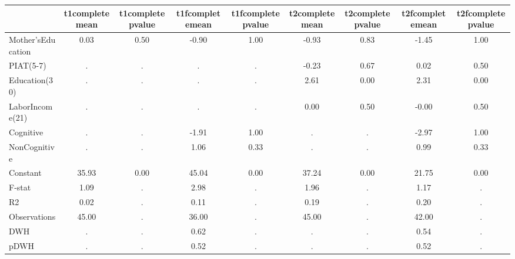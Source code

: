 \begin{table}[htbp]
\begin{tabular}{lcccccccc} \hline \hline
 & t1completemean  & t1completepvalue  & t1fcompletemean  & t1fcompletepvalue  & t2completemean  & t2completepvalue  & t2fcompletemean  & t2fcompletepvalue  \\  \hline 
Mother'sEducation &         0.03 &         0.50 &        -0.90 &         1.00 &        -0.93 &         0.83 &        -1.45 &         1.00 \\  
PIAT(5-7) &            . &            . &            . &            . &        -0.23 &         0.67 &         0.02 &         0.50 \\  
Education(30) &            . &            . &            . &            . &         2.61 &         0.00 &         2.31 &         0.00 \\  
LaborIncome(21) &            . &            . &            . &            . &         0.00 &         0.50 &        -0.00 &         0.50 \\  
Cognitive &            . &            . &        -1.91 &         1.00 &            . &            . &        -2.97 &         1.00 \\  
NonCognitive &            . &            . &         1.06 &         0.33 &            . &            . &         0.99 &         0.33 \\  
Constant &        35.93 &         0.00 &        45.04 &         0.00 &        37.24 &         0.00 &        21.75 &         0.00 \\  
F-stat &         1.09 &            . &         2.98 &            . &         1.96 &            . &         1.17 &            . \\  
R2 &         0.02 &            . &         0.11 &            . &         0.19 &            . &         0.20 &            . \\  
Observations &        45.00 &            . &        36.00 &            . &        45.00 &            . &        42.00 &            . \\  
DWH &            . &            . &         0.62 &            . &            . &            . &         0.54 &            . \\  
pDWH &            . &            . &         0.52 &            . &            . &            . &         0.52 &            . \\  
\hline \hline \end{tabular}
\end{table}
